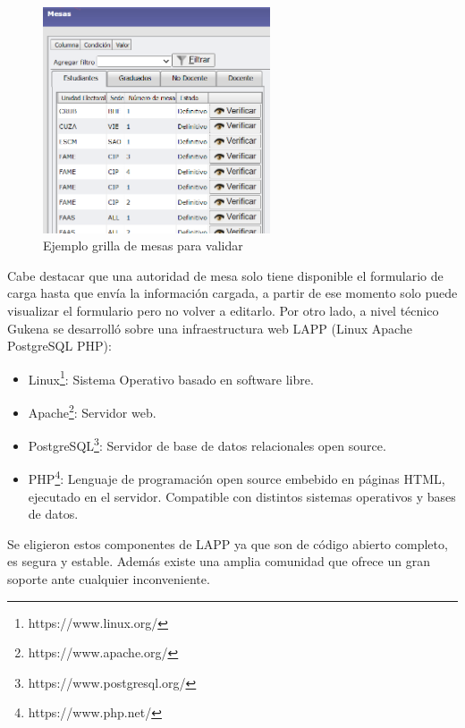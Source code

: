 \begin{figure}[h!]
    \begin{center}
       \includegraphics[width=0.6\textwidth]{img/ejemploGrillaMesasGukena.png}
    \end{center}
  \caption{Ejemplo grilla de mesas para validar}
  \label{graf:grillaGukena}
\end{figure}


Cabe destacar que una autoridad de mesa solo tiene disponible el formulario de carga hasta que envía la información cargada, a partir de ese momento solo puede visualizar el formulario pero no volver a editarlo.\newline 
Por otro lado, a nivel técnico Gukena se desarrolló sobre una infraestructura web LAPP (Linux Apache PostgreSQL PHP):
\begin{itemize}
    \item Linux\footnote{https://www.linux.org/}: Sistema Operativo basado en software libre.
    \item Apache\footnote{https://www.apache.org/}: Servidor web.
    \item PostgreSQL\footnote{https://www.postgresql.org/}: Servidor de base de datos relacionales open source.
    \item PHP\footnote{https://www.php.net/}: Lenguaje de programación open source embebido en páginas HTML, ejecutado en el servidor. Compatible con distintos sistemas operativos y bases de datos.
\end{itemize}
Se eligieron estos componentes de LAPP ya que son de código abierto completo, es segura y estable. Además existe una amplia comunidad que ofrece un gran soporte ante cualquier inconveniente. 

